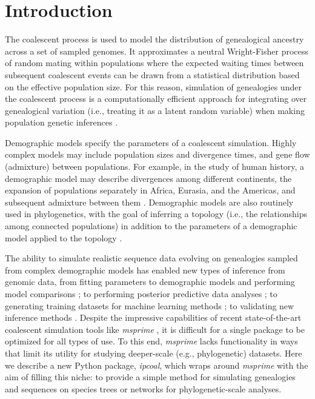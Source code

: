 \documentclass[11pt]{article}
\begin{document}
\section{Introduction}
The coalescent process \citep{hudson_testing_1983,kingman_coalescent_1982} is used to model the distribution of genealogical ancestry across a set of sampled genomes. It approximates a neutral Wright-Fisher process of random mating within populations where the expected waiting times between subsequent coalescent events can be drawn from a statistical distribution based on the effective population size. For this reason, simulation of genealogies under the coalescent process \citep{hudson_generating_2002} is a computationally efficient approach for integrating over genealogical variation (i.e., treating it as a latent random variable) when making population genetic inferences \citep{beerli_coalescent_2001}. 

Demographic models specify the parameters of a coalescent simulation. Highly complex models may include population sizes and divergence times, and gene flow (admixture) between populations. For example, in the study of human history, a demographic model may describe divergences among different continents, the expansion of populations separately in Africa, Eurasia, and the Americas, and subsequent admixture between them \citep{reich_who_2018,gronau_demography_2011,green_neandertal_2010}. Demographic models are also routinely used in phylogenetics, with the goal of inferring a topology (i.e., the relationships among connected populations) in addition to the parameters of a demographic model applied to the topology \citep{knowles_estimating_2011,degnan_gene_2009}. 

The ability to simulate realistic sequence data evolving on genealogies sampled from complex demographic models has enabled new types of inference from genomic data, from fitting parameters to demographic models and performing model comparisons \citep{chung_bayesian_2017}; to performing posterior predictive data analyses \citep{brown_predictive_2014}; to generating training datasets for machine learning methods \citep{schrider_learning_2017}; to validating new inference methods \citep{adrion_community_maintained_2019}. Despite the impressive capabilities of recent state-of-the-art coalescent simulation tools like \emph{msprime} \citep{kelleher_efficient_2016}, it is difficult for a single package to be optimized for all types of use. To this end, \emph{msprime} lacks functionality in ways that limit its utility for studying deeper-scale (e.g., phylogenetic) datasets. Here we describe a new Python package, \emph{ipcoal}, which wraps around \emph{msprime} with the aim of filling this niche: to provide a simple method for simulating genealogies and sequences on species trees or networks for phylogenetic-scale analyses.
\end{document}
